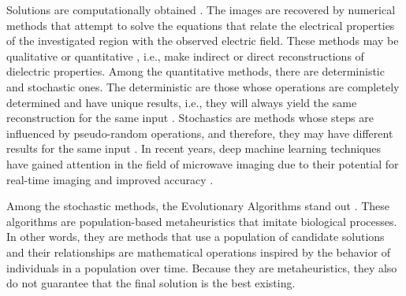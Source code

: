 	Solutions are computationally obtained \citep{chen2017,pastorino2010}. The images are recovered by numerical methods that attempt to solve the equations that relate the electrical properties of the investigated region with the observed electric field. These methods may be qualitative \citep{pastorino2010qualitative} or quantitative \citep{pastorino2010chap7}, i.e., make indirect or direct reconstructions of dielectric properties. Among the quantitative methods, there are deterministic and stochastic ones. The deterministic are those whose operations are completely determined and have unique results, i.e., they will always yield the same reconstruction for the same input \citep{pastorino2010deterministic}. Stochastics are methods whose steps are influenced by pseudo-random operations, and therefore, they may have different results for the same input \cite{pastorino2007stochastic}. In recent years, deep machine learning techniques have gained attention in the field of microwave imaging due to their potential for real-time imaging and improved accuracy \citep{chen2020review}.
	
	Among the stochastic methods, the Evolutionary Algorithms stand out \citep{eiben2015introduction}. These algorithms are population-based metaheuristics that imitate biological processes. In other words, they are methods that use a population of candidate solutions and their relationships are mathematical operations inspired by the behavior of individuals in a population over time. Because they are metaheuristics, they also do not guarantee that the final solution is the best existing.
	
